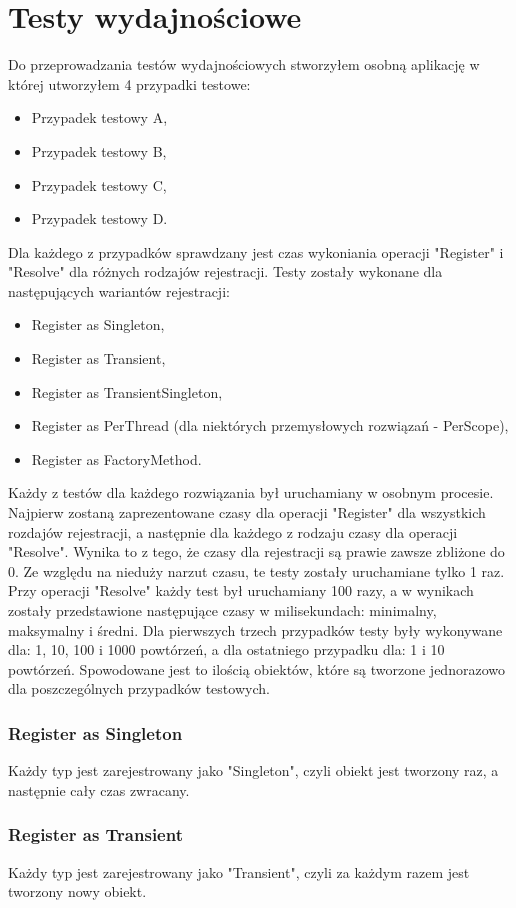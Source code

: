 \documentclass[12pt]{article}
\begin{document}
\section{Testy wydajnościowe}
Do przeprowadzania testów wydajnościowych stworzyłem osobną aplikację w której utworzyłem 4 przypadki testowe:
\begin{itemize}
	\item Przypadek testowy A,
	\item Przypadek testowy B,
	\item Przypadek testowy C,
	\item Przypadek testowy D.
\end{itemize}
Dla każdego z przypadków sprawdzany jest czas wykoniania operacji "Register" i "Resolve" dla różnych rodzajów rejestracji. Testy zostały wykonane dla następujących wariantów rejestracji:
\begin{itemize}
	\item Register as Singleton,
	\item Register as Transient,
	\item Register as TransientSingleton,
	\item Register as PerThread (dla niektórych przemysłowych rozwiązań - PerScope),
	\item Register as FactoryMethod.
\end{itemize}
Każdy z testów dla każdego rozwiązania był uruchamiany w osobnym procesie. Najpierw zostaną zaprezentowane czasy dla operacji "Register" dla wszystkich rozdajów rejestracji, a następnie dla każdego z rodzaju czasy dla operacji "Resolve". Wynika to z tego, że czasy dla rejestracji są prawie zawsze zbliżone do 0. Ze względu na nieduży narzut czasu, te testy zostały uruchamiane tylko 1 raz. Przy operacji "Resolve" każdy test był uruchamiany 100 razy, a w wynikach zostały przedstawione następujące czasy w milisekundach: minimalny, maksymalny i średni. Dla pierwszych trzech przypadków testy były wykonywane dla: 1, 10, 100 i 1000 powtórzeń, a dla ostatniego przypadku dla: 1 i 10 powtórzeń. Spowodowane jest to ilością obiektów, które są tworzone jednorazowo dla poszczególnych przypadków testowych.

\subsubsection{Register as Singleton}
Każdy typ jest zarejestrowany jako "Singleton", czyli obiekt jest tworzony raz, a następnie cały czas zwracany.

\subsubsection{Register as Transient}
Każdy typ jest zarejestrowany jako "Transient", czyli za każdym razem jest tworzony nowy obiekt.
\end{document}
